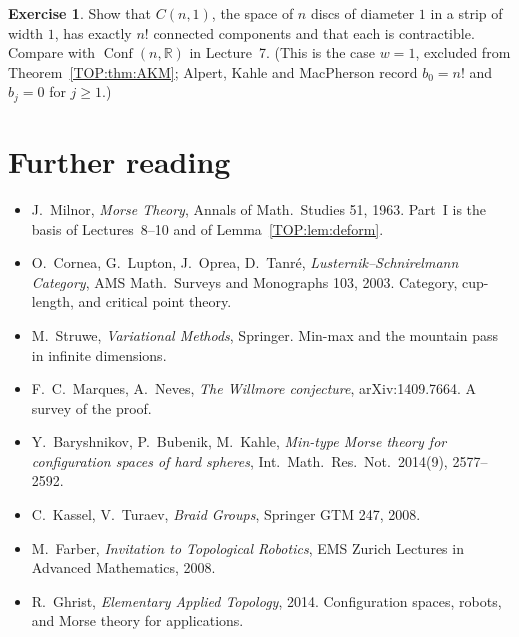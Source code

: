 \documentclass[11pt,openany]{book}
\theoremstyle{plain}
\theoremstyle{definition}
\newtheorem{exercise}[theorem]{Exercise}
\theoremstyle{remark}
\newcommand{\R}{\mathbb{R}}
\newcommand{\Conf}{\operatorname{Conf}}
\begin{document}
\begin{exercise}
Show that $C(n,1)$, the space of $n$ discs of diameter $1$ in a strip of width $1$, has exactly $n!$ connected
components and that each is contractible. Compare with $\Conf(n,\R)$ in Lecture~7. (This is the case
$w=1$, excluded from Theorem~\ref{TOP:thm:AKM}; Alpert, Kahle and MacPherson record $b_0=n!$ and $b_j=0$
for $j\ge1$.)
\end{exercise}

\section*{Further reading}
\begin{itemize}[nosep]
\item J.~Milnor, \emph{Morse Theory}, Annals of Math.\ Studies 51, 1963. Part~I is the basis of
  Lectures~8--10 and of Lemma~\ref{TOP:lem:deform}.
\item O.~Cornea, G.~Lupton, J.~Oprea, D.~Tanr\'e, \emph{Lusternik--Schnirelmann Category}, AMS Math.\ Surveys and
  Monographs 103, 2003. Category, cup-length, and critical point theory.
\item M.~Struwe, \emph{Variational Methods}, Springer. Min-max and the mountain pass in infinite dimensions.
\item F.~C.~Marques, A.~Neves, \emph{The Willmore conjecture}, arXiv:1409.7664. A survey of the proof.
\item Y.~Baryshnikov, P.~Bubenik, M.~Kahle, \emph{Min-type Morse theory for configuration spaces of hard
  spheres}, Int.\ Math.\ Res.\ Not.\ 2014(9), 2577--2592.
\item C.~Kassel, V.~Turaev, \emph{Braid Groups}, Springer GTM 247, 2008.
\item M.~Farber, \emph{Invitation to Topological Robotics}, EMS Zurich Lectures in Advanced Mathematics, 2008.
\item R.~Ghrist, \emph{Elementary Applied Topology}, 2014. Configuration spaces, robots, and Morse theory
  for applications.
\end{itemize}
\endgroup
\begingroup\renewcommand{\thechapter}{E}\renewcommand{\theHchapter}{interludeE}
\end{document}
